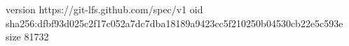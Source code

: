version https://git-lfs.github.com/spec/v1
oid sha256:dfbf93d025c2f17c052a7dc7dba18189a9423cc5f210250b04530cb22e5c593e
size 81732
